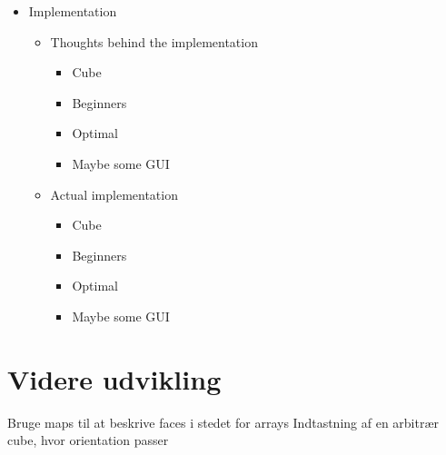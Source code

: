 \documentclass{article}
\begin{document}
\begin{itemize}
	\item Implementation
	\begin{itemize}
		\item Thoughts behind the implementation
		\begin{itemize}
			\item Cube
			\item Beginners
			\item Optimal
			\item Maybe some GUI
		\end{itemize}
		\item Actual implementation
		\begin{itemize}
			\item Cube
			\item Beginners
			\item Optimal
			\item Maybe some GUI 
		\end{itemize}
	\end{itemize}
\end{itemize}

\section{Videre udvikling}

Bruge maps til at beskrive faces i stedet for arrays
Indtastning af en arbitr\ae{}r cube, hvor orientation passer
\end{document}
